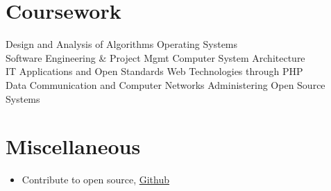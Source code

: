 \documentclass[]{friggeri-cv}
\begin{document}
\section{Coursework}
\begin{flushleft}
    Design and Analysis of Algorithms   \hspace{3cm} 
    Operating Systems\\ 
    Software Engineering \& Project Mgmt \hspace{2.45cm} Computer System Architecture \\  
    IT Applications and Open Standards \hspace{2.67cm} Web Technologies through PHP \\
    Data Communication and Computer Networks \hspace{1.15cm} Administering Open Source Systems

\end{flushleft}
 
\section{Miscellaneous}
\begin{itemize}
    \item Contribute to open source, \href{https://github.com/ritwik12}{Github}
\end{itemize}


 













% 
\end{document}
